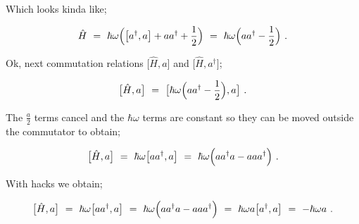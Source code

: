\documentclass{article}
\begin{document}
Which looks kinda like;

\begin{equation} \label{eq:256}
\hat{H} \hspace{0.125cm} = \hspace{0.125cm} \hbar \omega \Big( \big[ a^{\dagger} , a \big] + a a^{\dagger} +\frac{1}{2} \Big) \hspace{0.125cm} = \hspace{0.125cm} \hbar \omega \Big( a a^{\dagger} - \frac{1}{2} \Big) \hspace{0.125cm} .
\end{equation}

Ok, next commutation relations \begin{math} \big[ \hat{H} , a \big] \end{math} and \begin{math} \big[ \hat{H} , a^{\dagger} \big] \end{math};

\begin{equation} \label{eq:256}
\big[ \hat{H} , a \big]\hspace{0.125cm} = \hspace{0.125cm} \big[ \hbar \omega \Big( a a^{\dagger} - \frac{1}{2} \Big) , a \big] \hspace{0.125cm} .
\end{equation}

The \begin{math} \frac{a}{2} \end{math} terms cancel and the  \begin{math} \hbar \omega \end{math} terms are constant so they can be moved outside the commutator to obtain;

\begin{equation} \label{eq:256}
\big[ \hat{H} , a \big] \hspace{0.125cm} = \hspace{0.125cm} \hbar \omega \big[ a a^{\dagger}  , a \big] \hspace{0.125cm} = \hspace{0.125cm} \hbar \omega \Big( a a^{\dagger} a - a a a^{\dagger} \Big) \hspace{0.125cm} .
\end{equation}

With hacks we obtain;

\begin{equation} \label{eq:256}
\big[ \hat{H} , a \big] \hspace{0.125cm} = \hspace{0.125cm} \hbar \omega \big[ a a^{\dagger}  , a \big] \hspace{0.125cm} = \hspace{0.125cm} \hbar \omega \Big( a a^{\dagger} a - a a a^{\dagger} \Big) \hspace{0.125cm} = \hspace{0.125cm} \hbar \omega a \big[  a^{\dagger}  , a \big] \hspace{0.125cm} = \hspace{0.125cm} - \hbar \omega a \hspace{0.125cm}  .
\end{equation}
\end{document}
